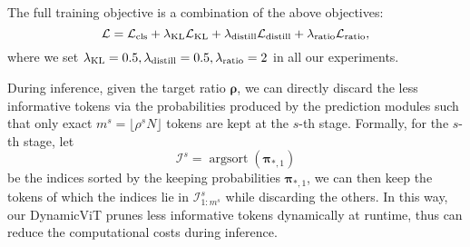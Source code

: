 \documentclass{article}
\newcommand{\dynamvit}{DynamicViT}
\DeclareMathOperator{\argsort}{argsort}
\begin{document}
The full training objective is a combination of the above objectives:
\begin{equation}
    \mathcal{L} = \mathcal{L}_{\rm cls} + \lambda_{\rm KL}\mathcal{L}_{\rm KL} +  \lambda_{\rm distill}\mathcal{L}_{\rm distill} + \lambda_{\rm ratio}\mathcal{L}_{\rm ratio},
\end{equation}
where we set $ \lambda_{\rm KL}=0.5,\lambda_{\rm distill}=0.5,\lambda_{\rm ratio}=2$ in all our experiments.

During inference, given the target ratio $\bm{\rho}$, we can directly discard the less informative tokens via the probabilities produced by the prediction modules such that only exact $m^s=\lfloor\rho^sN\rfloor$ tokens are kept at the $s$-th stage. Formally, for the $s$-th stage, let
\begin{equation}
\mathcal{I}^s = \argsort(\bm{\pi}_{*, 1})
\end{equation}
be the indices sorted by the keeping probabilities $\bm{\pi}_{*, 1}$, we can then keep the tokens of which the indices lie in $\mathcal{I}^s_{1:m^s}$ while discarding the others. In this way, our \dynamvit{} prunes less informative tokens dynamically at runtime, thus can reduce the computational costs during inference.
\end{document}
